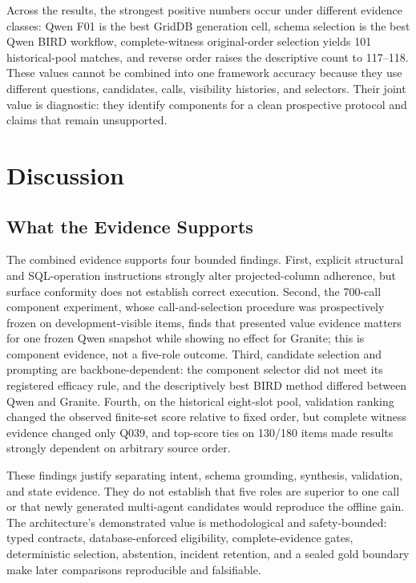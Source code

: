 \documentclass[applsci,article,submit,moreauthors]{Definitions/mdpi}
\begin{document}
Across the results, the strongest positive numbers occur under different evidence classes: Qwen F01 is the best GridDB generation cell, schema selection is the best Qwen BIRD workflow, complete-witness original-order selection yields 101 historical-pool matches, and reverse order raises the descriptive count to 117--118. These values cannot be combined into one framework accuracy because they use different questions, candidates, calls, visibility histories, and selectors. Their joint value is diagnostic: they identify components for a clean prospective protocol and claims that remain unsupported.

\section{Discussion}

\subsection{What the Evidence Supports}

The combined evidence supports four bounded findings. First, explicit structural and SQL-operation instructions strongly alter projected-column adherence, but surface conformity does not establish correct execution. Second, the 700-call component experiment, whose call-and-selection procedure was prospectively frozen on development-visible items, finds that presented value evidence matters for one frozen Qwen snapshot while showing no effect for Granite; this is component evidence, not a five-role outcome. Third, candidate selection and prompting are backbone-dependent: the component selector did not meet its registered efficacy rule, and the descriptively best BIRD method differed between Qwen and Granite. Fourth, on the historical eight-slot pool, validation ranking changed the observed finite-set score relative to fixed order, but complete witness evidence changed only Q039, and top-score ties on 130/180 items made results strongly dependent on arbitrary source order.

These findings justify separating intent, schema grounding, synthesis, validation, and state evidence. They do not establish that five roles are superior to one call or that newly generated multi-agent candidates would reproduce the offline gain. The architecture's demonstrated value is methodological and safety-bounded: typed contracts, database-enforced eligibility, complete-evidence gates, deterministic selection, abstention, incident retention, and a sealed gold boundary make later comparisons reproducible and falsifiable.
\end{document}
